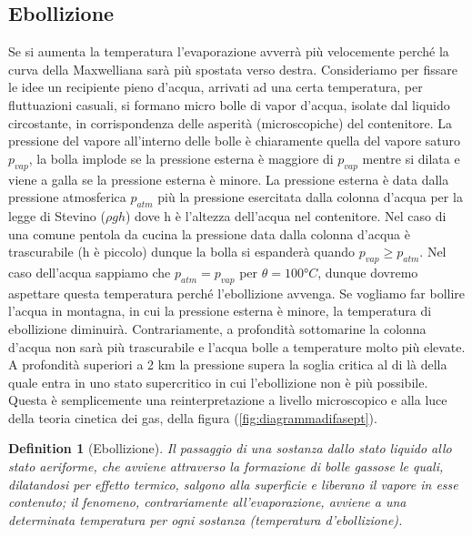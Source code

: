 \documentclass[10pt,a4paper]{article}
\newtheorem{definition}{Definition}
\begin{document}
\subsection{Ebollizione}
Se si aumenta la temperatura l'evaporazione avverrà più velocemente perché la curva della Maxwelliana sarà più spostata verso destra. Consideriamo per fissare le idee un recipiente pieno d'acqua, arrivati ad una certa temperatura, per fluttuazioni casuali, si formano micro bolle di vapor d'acqua, isolate dal liquido circostante, in corrispondenza delle asperità (microscopiche) del contenitore. La pressione del vapore all'interno delle bolle è chiaramente quella del vapore saturo $p_{vap}$, la bolla implode se la pressione esterna è maggiore di $p_{vap}$ mentre si dilata e viene a galla se la pressione esterna è minore. La pressione esterna è data dalla pressione atmosferica $p_{atm}$ più la pressione esercitata dalla colonna d'acqua per la legge di Stevino ($\rho g h$) dove h è l'altezza dell'acqua nel contenitore. Nel caso di una comune pentola da cucina la pressione data dalla colonna d'acqua è trascurabile (h è piccolo) dunque la bolla si espanderà quando $p_{vap} \geq p_{atm}$. Nel caso dell'acqua sappiamo che $p_{atm} = p_{vap}$ per $\theta = 100 °C$, dunque dovremo aspettare questa temperatura perché l'ebollizione avvenga. Se vogliamo far bollire l'acqua in montagna, in cui la pressione esterna è minore, la temperatura di ebollizione diminuirà. Contrariamente, a profondità sottomarine la colonna d'acqua non sarà più trascurabile e l'acqua bolle a temperature molto più elevate. A profondità superiori a 2 km la pressione supera la soglia critica al di là della quale entra in uno stato supercritico in cui l'ebollizione non è più possibile. Questa è semplicemente una reinterpretazione a livello microscopico e alla luce della teoria cinetica dei gas, della figura (\ref{fig:diagrammadifasept}). 
\begin{definition}[Ebollizione]
	Il passaggio di una sostanza dallo stato liquido allo stato aeriforme, che avviene attraverso la formazione di bolle gassose le quali, dilatandosi per effetto termico, salgono alla superficie e liberano il vapore in esse contenuto; il fenomeno, contrariamente all'evaporazione, avviene a una determinata temperatura per ogni sostanza (temperatura d'ebollizione).
\end{definition}
\end{document}
